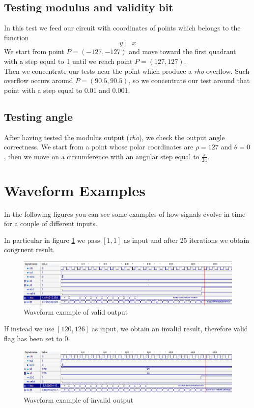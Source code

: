 \documentclass[12pt,a4paper]{report}
\begin{document}
\subsection{Testing modulus and validity bit}
In this test we feed our circuit with coordinates of points which belongs to the function
	\begin{equation}
		y = x
  	\end{equation}
We start from point $P = \left(-127, -127\right)$ and move toward the first quadrant with a step equal to 1 until we reach point $P=(127,127)$.\\
Then we concentrate our tests near the point which produce a \emph{rho} overflow. Such overflow occurs around $P=(90.5,90.5)$, so we concentrate our test around that point with a step equal to 0.01 and 0.001.

\subsection{Testing angle}
After having tested the modulus output (\emph{rho}), we check the output angle correctness. We start from a point whose polar coordinates are $\rho=127$ and $\theta=0$, then we move on a circumference with an angular step equal to $\frac{\pi}{24}$.

\section{Waveform Examples}
In the following figures you can see some examples of how signals evolve in time for a couple of different inputs.

In particular in figure \ref{fig:bisector} we pass $[1,1]$ as input and after 25 iterations we obtain congruent result.


\begin{figure}[!h]
\centering
\includegraphics[width=\textwidth]{img/test-bisettrice.png}
\caption{Waveform example of valid output\label{fig:bisector}}
\end{figure}

If instead we use $[120,126]$ as input, we obtain an invalid result, therefore valid flag has been set to 0.

\begin{figure}[!h]
\centering
\includegraphics[width=\textwidth]{img/test-valid.png}
\caption{Waveform example of invalid output\label{fig:invalid}}
\end{figure}
\end{document}
